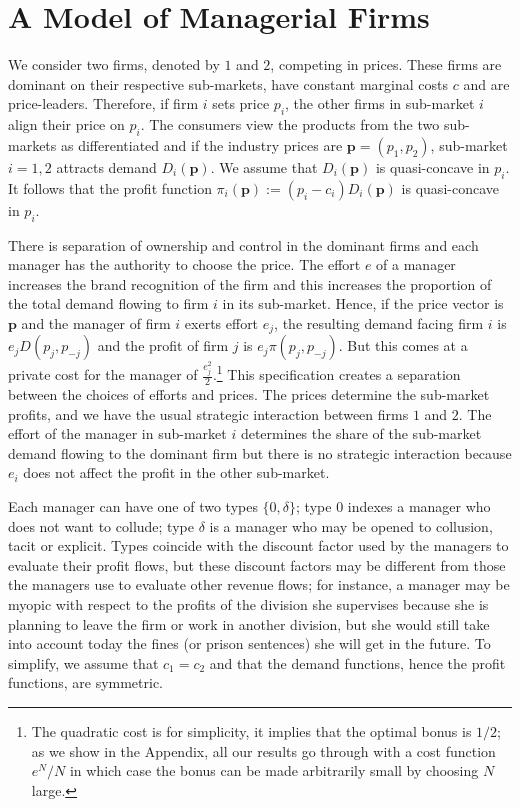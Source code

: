 \documentclass[]{article}
\newcommand{\p}{\mathbf p}
\begin{document}
\section{A Model of Managerial Firms}
\label{sec:model}
We consider two firms, denoted by $1$ and $2$, competing in prices. These firms are dominant on their respective sub-markets, have constant marginal costs $c$ and are price-leaders. Therefore, if firm $i$ sets price $p_i$, the other firms in sub-market $i$ align their price on $p_i$. The consumers view the products from the two sub-markets as differentiated and if the industry prices are $\p=(p_1,p_2)$, sub-market $i=1,2$ attracts demand $D_i(\p)$. We assume that $D_i(\p)$ is quasi-concave in $p_i$. It follows that the profit function $\pi_i(\p):=(p_i-c_i)D_i(\p)$ is quasi-concave in $p_i$.

There is separation of ownership and control in the dominant firms and each manager has the authority to choose the price. The effort $e$ of a manager increases the brand recognition of the firm and this increases the proportion of the total demand flowing to firm $i$ in its sub-market. Hence, if the price vector is $\p$ and the manager of firm $i$ exerts effort $e_j$, the resulting demand facing firm $i$ is $e_j D(p_j,p_{-j})$ and the profit of firm $j$ is $e_j\pi(p_j,p_{-j})$. But this comes at a private cost for the manager of $\frac{e_j^2}{2}$.\footnote{%
The quadratic cost is for simplicity, it implies that the optimal bonus is $1/2$; as we show in the Appendix, all our results go through with a cost function $e^N/N$ in which case the bonus can be made arbitrarily small by choosing $N$ large.
}
%
This specification creates a separation between the choices of efforts and prices. The prices determine the sub-market profits, and we have the usual strategic interaction between firms $1$ and $2$. The effort of the manager in sub-market $i$ determines the share of the sub-market demand flowing to the dominant firm but there is no strategic interaction because $e_i$ does not affect the profit in the other sub-market. 

Each manager can have one of two types $\{0,\delta\}$; type $0$ indexes a manager who does not want to collude; type $\delta$ is a manager who may be opened to collusion, tacit or explicit. Types coincide with the discount factor used by the managers to evaluate their profit flows, but these discount factors may be different from those the managers use to evaluate other revenue flows; for instance, a manager may be myopic with respect to the profits of the division she supervises because she is planning to leave the firm or work in another division, but she would still take into account today the fines (or prison sentences) she will get in the future. To simplify, we assume that $c_1=c_2$ and that the demand functions, hence the profit functions, are symmetric.
\end{document}
